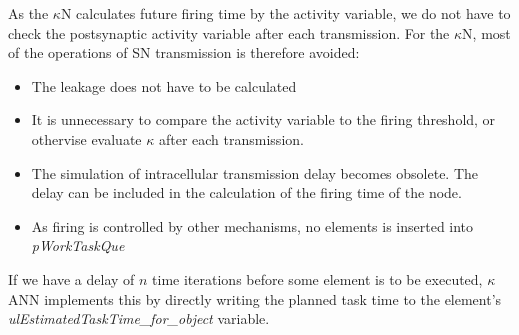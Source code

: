 		As the $\kappa$N calculates future firing time by the activity variable, we do not have to check the postsynaptic activity variable after each transmission.
		For the $\kappa$N, most of the operations of SN transmission is therefore avoided:
		\begin{itemize}
			\item The leakage does not have to be calculated
			\item It is unnecessary to compare the activity variable to the firing threshold, or othervise evaluate $\kappa$ after each transmission.
			\item The simulation of intracellular transmission delay becomes obsolete. The delay can be included in the calculation of the firing time of the node.
			\item As firing is controlled by other mechanisms, no elements is inserted into \emph{pWorkTaskQue}
		\end{itemize}
		If we have a delay of $n$ time iterations before some element is to be executed, 
			$\kappa$ANN implements this by directly writing the planned task time to the element's \emph{ulEstimatedTaskTime\_for\_object} variable.

%		

